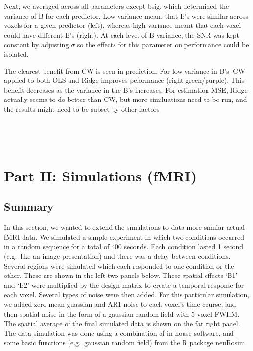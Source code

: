 \documentclass{article}
\begin{document}
Next, we averaged across all parameters except bsig, which determined
the variance of B for each predictor. Low variance meant that B's were
similar across voxels for a given predictor (left), whereas high
variance meant that each voxel could have different B's (right). At each
level of B variance, the SNR was kept constant by adjusting $ \sigma $
so the effects for this parameter on performance could be isolated.

The clearest benefit from CW is seen in prediction. For low variance in
B's, CW applied to both OLS and Ridge improves peformance (right
green/purple). This benefit decreases as the variance in the B's
increases. For estimation MSE, Ridge actually seems to do better than
CW, but more similuations need to be run, and the results might need to
be subset by other factors


    \begin{center}
    \end{center}
    { \hspace*{\fill} \\}
    

    \begin{center}
    \end{center}
    { \hspace*{\fill} \\}
    
    \section{Part II: Simulations (fMRI)}\label{part-ii-simulations-fmri}

\subsection{Summary}

In this section, we wanted to extend the simulations to data more
similar actual fMRI data. We simulated a simple experiment in which two
conditions occurred in a random sequence for a total of 400 seconds.
Each condition lasted 1 second (e.g.~like an image presentation) and
there was a delay between conditions. Several regions were simulated
which each responded to one condition or the other. These are shown in
the left two panels below. These spatial effects `B1' and `B2' were
multiplied by the design matrix to create a temporal response for each
voxel. Several types of noise were then added. For this particular
simulation, we added zero-mean guassian and AR1 noise to each voxel's
time course, and then spatial noise in the form of a gaussian random
field with 5 voxel FWHM. The spatial average of the final simulated data
is shown on the far right panel. The data simulation was done using a
combination of in-house software, and some basic functions
(e.g.~gaussian random field) from the R package neuRosim.
\end{document}
